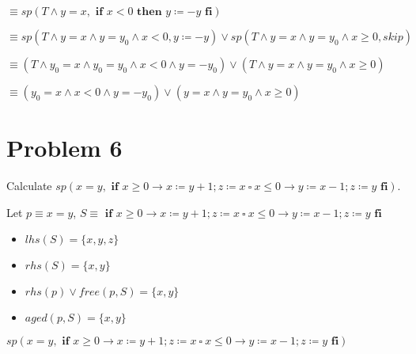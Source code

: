\documentclass{article}
\begin{document}
\qquad \qquad \qquad  $ \equiv sp(T \wedge y = x, \textbf{ if } x<0 \textbf{ then } y \coloneqq -y \textbf{ fi})$

\qquad \qquad \qquad  $ \equiv sp(T \wedge y = x \wedge y=y_0 \wedge x<0, y \coloneqq -y) \vee sp (T \wedge y = x \wedge y=y_0 \wedge x \geq 0, skip) $

\qquad \qquad \qquad  $ \equiv (T \wedge y_0 = x \wedge y_0=y_0 \wedge x<0 \wedge y = -y_0) \vee (T \wedge y = x \wedge y=y_0 \wedge x \geq 0) $

\qquad \qquad \qquad  $ \equiv (y_0 = x \wedge x<0 \wedge y = -y_0) \vee (y = x \wedge y=y_0 \wedge x \geq 0) $

\section*{Problem 6}

Calculate $ sp(x=y, \textbf{ if } x \geq 0 \rightarrow x \coloneqq y+1; z \coloneqq x  \ \square \ x \leq 0 \rightarrow y \coloneqq x-1; z \coloneqq y \textbf{ fi}) $.
\vspace{10pt}

Let $p \equiv x=y$, $ S \equiv \textbf{ if } x \geq 0 \rightarrow x \coloneqq y+1; z \coloneqq x  \ \square \ x \leq 0 \rightarrow y \coloneqq x-1; z \coloneqq y \textbf{ fi} $

\begin{itemize}
\item $lhs(S)=\{x,y,z\}$
\item $rhs(S)=\{x,y\}$
\item $rhs(p) \vee free(p,S)=\{x,y\}$
\item $aged(p,S)=\{x,y\}$
\end{itemize}


$ sp(x=y, \textbf{ if } x \geq 0 \rightarrow x \coloneqq y+1; z \coloneqq x  \ \square \ x \leq 0 \rightarrow y \coloneqq x-1; z \coloneqq y \textbf{ fi}) $
\end{document}
